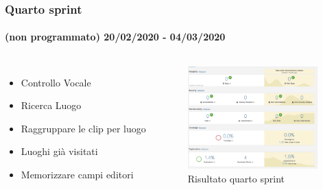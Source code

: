 \documentclass{beamer}
\begin{document}
\begin{frame}
\frametitle{Quarto sprint}
\framesubtitle{(non programmato) 20/02/2020 - 04/03/2020}
\begin{columns}
  \begin{itemize}
	\item Controllo Vocale
	\item Ricerca Luogo
	\item Raggruppare le clip per luogo
	\item Luoghi già visitati
	\item Memorizzare campi editori
  \end{itemize}
	\begin{figure}[h]
	\centering
        \includegraphics[width=5cm]{Images/SonarQube/ultimo-sprint.png}
        \caption{Risultato quarto sprint}
   \end{figure}
\end{columns}
\end{frame}

\end{document}
